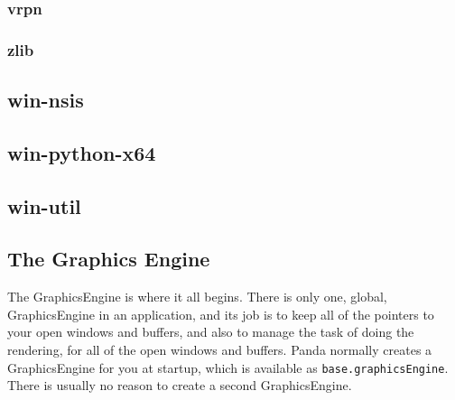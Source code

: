 \documentclass[a4paper]{article}
\newcommand\textstyleSourceText[1]{\texttt{#1}}
\begin{document}
\hypertarget{RefHeading24611167907073}{}\subsubsection{}
\clearpage\subsubsection[vrpn]{vrpn}
\hypertarget{RefHeading24631167907073}{}\subsubsection{}
\clearpage\subsubsection[zlib]{zlib}
\hypertarget{RefHeading24651167907073}{}\clearpage\subsection[win{}-nsis]{win-nsis}
\hypertarget{RefHeading24671167907073}{}\clearpage\subsection[win{}-python{}-x64]{win-python-x64}
\hypertarget{RefHeading24691167907073}{}\clearpage\subsection[win{}-util]{win-util}
\hypertarget{RefHeading24711167907073}{}

\clearpage\subsection[The Graphics Engine]{The Graphics Engine}
\hypertarget{RefHeading3589869075401}{}{\color{black}
The GraphicsEngine is where it all begins. There is only one, global, GraphicsEngine in an application, and its job is
to keep all of the pointers to your open windows and buffers, and also to manage the task of doing the rendering, for
all of the open windows and buffers. Panda normally creates a GraphicsEngine for you at startup, which is available as
\textstyleSourceText{\textrm{base.graphicsEngine}}. There is usually no reason to create a second GraphicsEngine. }


\bigskip
\end{document}

